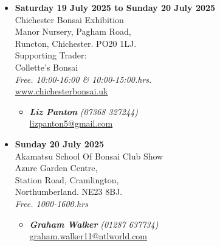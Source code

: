 \begin{itemize}
    \item \textbf{Saturday 19 July 2025 to Sunday 20 July 2025}
    \\
    Chichester Bonsai Exhibition \\
    Manor Nursery, Pagham Road, \\
    Runcton, Chichester. PO20 1LJ. \\
    Supporting Trader: \\
    Collette's Bonsai
    \\
    \emph{Free. 10:00-16:00 \& 10:00-15:00.hrs.}
    \\
    \href{http://www.chichesterbonsai.uk/}{www.chichesterbonsai.uk}
    \begin{itemize}
        \item \textbf{\emph{Liz Panton}} \emph{(07368 327244)} \\
        \href{mailto:lizpanton5@gmail.com}{lizpanton5@gmail.com} 
    \end{itemize}

    \item \textbf{Sunday 20 July 2025}
    \\
    Akamatsu School Of Bonsai Club Show \\
    Azure Garden Centre, \\
    Station Road, Cramlington, \\
    Northumberland. NE23 8BJ.
    \\
    \emph{Free. 1000-1600.hrs}
    \begin{itemize}
        \item \textbf{\emph{Graham Walker}} \emph{(01287 637734)} \\
        \href{mailto:graham.walker11@ntlworld.com}{graham.walker11@ntlworld.com} 
    \end{itemize}

\end{itemize}
\closearticle